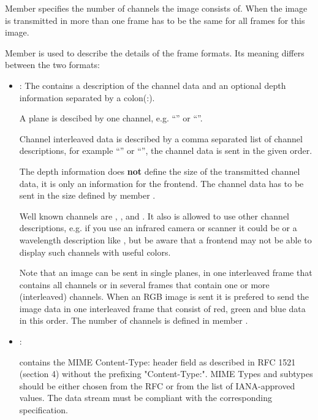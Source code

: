 \documentclass[11pt,DVIps]{report}
\begin{document}
\begin{changebar}
Member  specifies the number of channels the
image consists of. When the image is transmitted in more than one frame
 has to be the same for all frames for this image.

Member  is used to describe the details of the frame
formats.  Its meaning differs between the two formats:

\begin{itemize}
\item
{}: 
The  contains a description of the channel data and
an optional depth information separated by a colon(:).

A plane is descibed by one channel, e.g. ``'' or ``''.

Channel interleaved data is described by a comma separated list of channel descriptions,
for example ``'' or ``'',
the channel data is sent in the given order.

The depth information does {\bf not} define the size of the transmitted
channel data, it is only an information for the frontend. The channel data has
to be sent in the size defined by member .

Well known channels are , ,  and .
It also is allowed to use other channel descriptions, e.g. if you
use an infrared camera or scanner it could be  or
a wavelength description like , but be aware that a
frontend may not be able to display such channels with useful colors.

Note that an image can be sent in single planes, in one interleaved
frame that contains all channels or in several frames that contain
one or more (interleaved) channels. When an RGB image is sent it
is prefered to send the image data in one interleaved frame
that consist of red, green and blue data in this order.
The number of channels is defined in member .

\item
{}: 

 contains the MIME Content-Type: header field as described
in RFC 1521 (section 4) without the prefixing "Content-Type:". MIME Types and
subtypes should be either chosen from the RFC or from the list of
IANA-approved values. The data stream must be compliant with the corresponding
specification.


\end{itemize}
\end{changebar}
\end{document}

